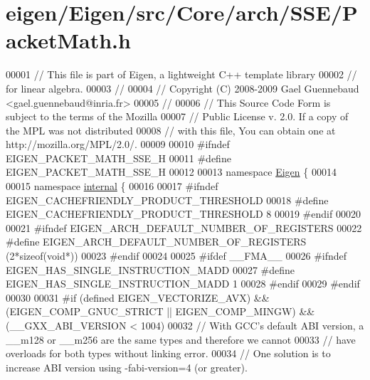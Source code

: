 \hypertarget{eigen_2_eigen_2src_2_core_2arch_2_s_s_e_2_packet_math_8h_source}{}\section{eigen/\+Eigen/src/\+Core/arch/\+S\+S\+E/\+Packet\+Math.h}
\label{eigen_2_eigen_2src_2_core_2arch_2_s_s_e_2_packet_math_8h_source}

\begin{DoxyCode}
00001 \textcolor{comment}{// This file is part of Eigen, a lightweight C++ template library}
00002 \textcolor{comment}{// for linear algebra.}
00003 \textcolor{comment}{//}
00004 \textcolor{comment}{// Copyright (C) 2008-2009 Gael Guennebaud <gael.guennebaud@inria.fr>}
00005 \textcolor{comment}{//}
00006 \textcolor{comment}{// This Source Code Form is subject to the terms of the Mozilla}
00007 \textcolor{comment}{// Public License v. 2.0. If a copy of the MPL was not distributed}
00008 \textcolor{comment}{// with this file, You can obtain one at http://mozilla.org/MPL/2.0/.}
00009 
00010 \textcolor{preprocessor}{#ifndef EIGEN\_PACKET\_MATH\_SSE\_H}
00011 \textcolor{preprocessor}{#define EIGEN\_PACKET\_MATH\_SSE\_H}
00012 
00013 \textcolor{keyword}{namespace }\hyperlink{namespace_eigen}{Eigen} \{
00014 
00015 \textcolor{keyword}{namespace }\hyperlink{namespaceinternal}{internal} \{
00016 
00017 \textcolor{preprocessor}{#ifndef EIGEN\_CACHEFRIENDLY\_PRODUCT\_THRESHOLD}
00018 \textcolor{preprocessor}{#define EIGEN\_CACHEFRIENDLY\_PRODUCT\_THRESHOLD 8}
00019 \textcolor{preprocessor}{#endif}
00020 
00021 \textcolor{preprocessor}{#ifndef EIGEN\_ARCH\_DEFAULT\_NUMBER\_OF\_REGISTERS}
00022 \textcolor{preprocessor}{#define EIGEN\_ARCH\_DEFAULT\_NUMBER\_OF\_REGISTERS (2*sizeof(void*))}
00023 \textcolor{preprocessor}{#endif}
00024 
00025 \textcolor{preprocessor}{#ifdef \_\_FMA\_\_}
00026 \textcolor{preprocessor}{#ifndef EIGEN\_HAS\_SINGLE\_INSTRUCTION\_MADD}
00027 \textcolor{preprocessor}{#define EIGEN\_HAS\_SINGLE\_INSTRUCTION\_MADD 1}
00028 \textcolor{preprocessor}{#endif}
00029 \textcolor{preprocessor}{#endif}
00030 
00031 \textcolor{preprocessor}{#if (defined EIGEN\_VECTORIZE\_AVX) && (EIGEN\_COMP\_GNUC\_STRICT || EIGEN\_COMP\_MINGW) && (\_\_GXX\_ABI\_VERSION <
       1004)}
00032 \textcolor{comment}{// With GCC's default ABI version, a \_\_m128 or \_\_m256 are the same types and therefore we cannot}
00033 \textcolor{comment}{// have overloads for both types without linking error.}
00034 \textcolor{comment}{// One solution is to increase ABI version using -fabi-version=4 (or greater).}

\end{DoxyCode}

